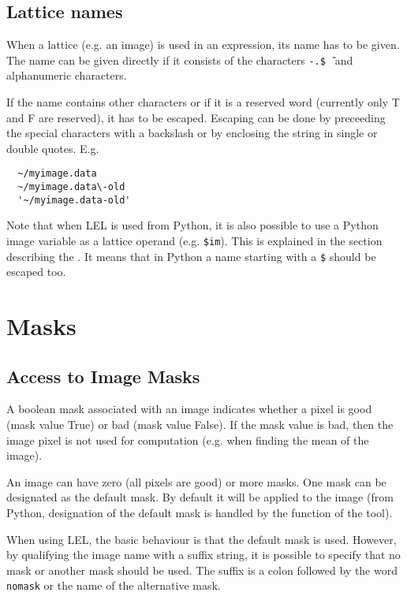 \subsection{\label{LEL:LATTICES}Lattice names}

When a lattice (e.g.  an image) is used in an expression, its name has
to be given.  The name can be given directly if it consists of the
characters \texttt{-}\texttt{.}\texttt{\$}\texttt{\~\ } and alphanumeric
characters. 

\medskip\noindent If the name contains other characters or if it is a reserved word
(currently only T and F are reserved), it has to be escaped.  Escaping
can be done by preceeding the special characters with a backslash or by
enclosing the string in single or double quotes.  E.g. 

\begin{verbatim}
  ~/myimage.data
  ~/myimage.data\-old
  '~/myimage.data-old'
\end{verbatim}

\medskip\noindent Note that when LEL is used from Python, it is also
possible to use
a Python image variable as a lattice operand (e.g. \texttt{\$im}).
This is explained in the section describing the
. It means that in Python a
name starting with a \texttt{\$} should be escaped too.


\section{\label{LEL:MASKS}Masks}

\subsection{Access to Image Masks}

A boolean mask associated with an image indicates whether a pixel is
good (mask value True) or bad (mask value False).  If the mask value is
bad, then the image pixel is not used for computation (e.g.  when
finding the mean of the image). 

\medskip\noindent An image can have zero (all pixels are good) or more masks.  One mask
can be designated as the default mask.  By default it will be applied to
the image (from Python, designation of the default mask is handled by the
 function
of the  tool).

\medskip\noindent When using LEL, the basic behaviour is that the default mask is used. 
However, by qualifying the image name with a suffix string, it is
possible to specify that no mask or another mask should be used.  The suffix
is a colon followed by the word \texttt{nomask} or the name of the
alternative mask.

